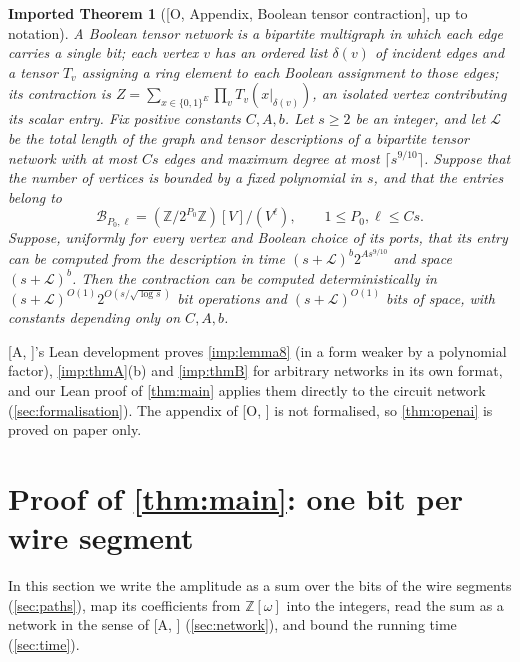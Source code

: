 \documentclass[10pt]{amsart}
\theoremstyle{plain}
\newtheorem{importedtheorem}[theorem]{Imported Theorem}
\theoremstyle{definition}
\theoremstyle{remark}
\numberwithin{equation}{section}
\newcommand{\Z}{\mathbb{Z}}
\newcommand{\Zw}{\Z[\omega]}
\newcommand{\cB}{\mathcal{B}}
\newcommand{\cL}{\mathcal{L}}
\newcommand{\A}[1][]{\textup{[A\if\relax\detokenize{#1}\relax\else, #1\fi]}}
\newcommand{\Oa}[1][]{\textup{[O\if\relax\detokenize{#1}\relax\else, #1\fi]}}
\begin{document}
\begin{importedtheorem}[{\Oa[Appendix, Boolean tensor contraction], up to notation}]\label{imp:tensor}
A Boolean tensor network is a bipartite multigraph in which each edge carries a single bit; each
vertex $v$ has an ordered list $\delta(v)$ of incident edges and a tensor $T_v$ assigning a ring
element to each Boolean assignment to those edges; its contraction is
$Z=\sum_{x\in\{0,1\}^{E}}\prod_vT_v(x|_{\delta(v)})$, an isolated vertex contributing its scalar
entry. Fix positive constants $C,A,b$. Let $s\ge2$ be an integer, and let $\cL$ be the total
length of the graph and tensor descriptions of a bipartite tensor network with at most $Cs$
edges and maximum degree at most $\lceil s^{9/10}\rceil$. Suppose that the number of vertices is
bounded by a fixed polynomial in $s$, and that the entries belong to
\[
  \cB_{P_0,\ell}=(\Z/2^{P_0}\Z)[V]/(V^\ell),\qquad 1\le P_0,\ell\le Cs.
\]
Suppose, uniformly for every vertex and Boolean choice of its ports, that its entry can be
computed from the description in time $(s+\cL)^b2^{As^{9/10}}$ and space $(s+\cL)^b$. Then the
contraction can be computed deterministically in $(s+\cL)^{O(1)}2^{O(s/\sqrt{\log s})}$ bit
operations and $(s+\cL)^{O(1)}$ bits of space, with constants depending only on $C,A,b$.
\end{importedtheorem}

\A's Lean development proves \cref{imp:lemma8} (in a form weaker by a polynomial factor),
\cref{imp:thmA}(b) and \cref{imp:thmB} for arbitrary networks in its own format, and our Lean proof
of \cref{thm:main} applies them directly to the circuit network (\cref{sec:formalisation}). The
appendix of \Oa{} is not formalised, so \cref{thm:openai} is proved on paper only.

\section{Proof of \texorpdfstring{\cref{thm:main}}{Theorem 1.1}: one bit per wire segment}\label{sec:proof}

In this section we write the amplitude as a sum over the bits of the wire segments
(\cref{sec:paths}), map its coefficients from $\Zw$ into the integers, read the sum as a network
in the sense of \A{} (\cref{sec:network}), and bound the running time (\cref{sec:time}).
\end{document}
